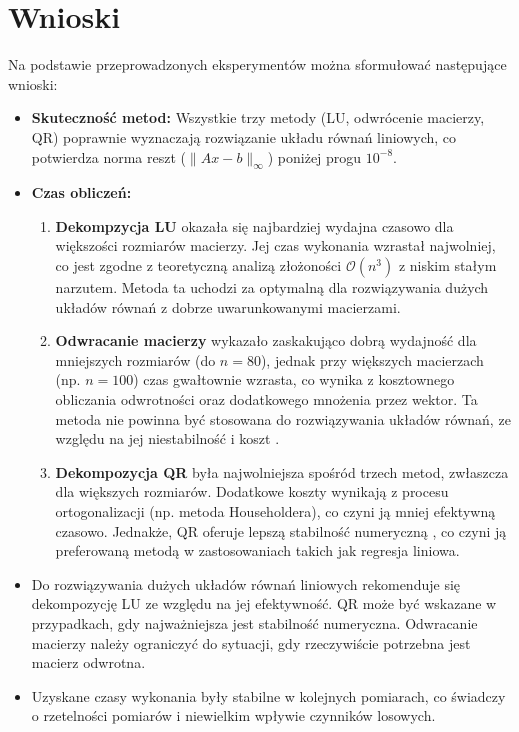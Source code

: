 \documentclass[a4paper,12pt]{article}
\begin{document}
\section*{Wnioski}

Na podstawie przeprowadzonych eksperymentów można sformułować następujące wnioski:
\begin{itemize}
  \item \textbf{Skuteczność metod:} Wszystkie trzy metody (LU, odwrócenie macierzy, QR) poprawnie wyznaczają rozwiązanie układu równań liniowych, co potwierdza norma reszt (\(\|Ax - b\|_\infty\)) poniżej progu \(10^{-8}\).
  
  \item \textbf{Czas obliczeń:} 
    \begin{enumerate}
      \item \textbf{Dekompzycja LU} okazała się najbardziej wydajna czasowo dla większości rozmiarów macierzy. Jej czas wykonania wzrastał najwolniej, co jest zgodne z teoretyczną analizą złożoności \(\mathcal{O}(n^3)\) z niskim stałym narzutem. Metoda ta uchodzi za optymalną \cite{Rycerz} dla rozwiązywania dużych układów równań z dobrze uwarunkowanymi macierzami.
      
      \item \textbf{Odwracanie macierzy} wykazało zaskakująco dobrą wydajność dla mniejszych rozmiarów (do \(n=80\)), jednak przy większych macierzach (np. \(n=100\)) czas gwałtownie wzrasta, co wynika z kosztownego obliczania odwrotności oraz dodatkowego mnożenia przez wektor. Ta metoda nie powinna być stosowana do rozwiązywania układów równań, ze względu na jej niestabilność i koszt \cite{Rycerz}.
      
      \item \textbf{Dekompozycja QR} była najwolniejsza spośród trzech metod, zwłaszcza dla większych rozmiarów. Dodatkowe koszty wynikają z procesu ortogonalizacji (np. metoda Householdera), co czyni ją mniej efektywną czasowo. Jednakże, QR oferuje lepszą stabilność numeryczną \cite{wiki:Rozkład_QR}, co czyni ją preferowaną metodą w zastosowaniach takich jak regresja liniowa.
    \end{enumerate}
  
  \item Do rozwiązywania dużych układów równań liniowych rekomenduje się dekompozycję LU ze względu na jej efektywność. QR może być wskazane w przypadkach, gdy najważniejsza jest stabilność numeryczna. Odwracanie macierzy należy ograniczyć do sytuacji, gdy rzeczywiście potrzebna jest macierz odwrotna.
  
  \item Uzyskane czasy wykonania były stabilne w kolejnych pomiarach, co świadczy o rzetelności pomiarów i niewielkim wpływie czynników losowych.
\end{itemize}




\end{document}
